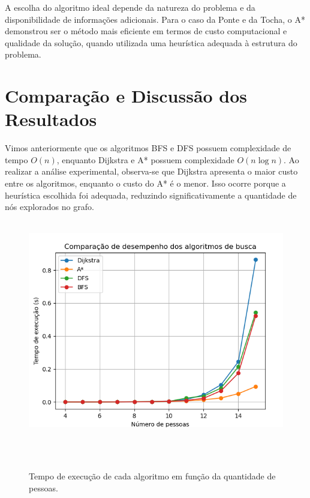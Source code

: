 \documentclass[12pt,a4paper]{article}
\begin{document}
A escolha do algoritmo ideal depende da natureza do problema e da disponibilidade de informações adicionais. 
Para o caso da Ponte e da Tocha, o A* demonstrou ser o método mais eficiente em termos de custo computacional e qualidade da solução, quando utilizada uma heurística adequada à estrutura do problema.

\section{Comparação e Discussão dos Resultados}

Vimos anteriormente que os algoritmos BFS e DFS possuem complexidade de tempo $O(n)$, enquanto Dijkstra e A* possuem complexidade $O(n \log n)$. Ao realizar a análise experimental, observa-se que Dijkstra apresenta o maior custo entre os algoritmos, enquanto o custo do A* é o menor. Isso ocorre porque a heurística escolhida foi adequada, reduzindo significativamente a quantidade de nós explorados no grafo.

\begin{figure}[H]
    \centering
    \includegraphics[width=0.8\linewidth]{execution_time.png}
    \caption{Tempo de execução de cada algoritmo em função da quantidade de pessoas.}
    \label{fig:cen2}
\end{figure}
\end{document}
